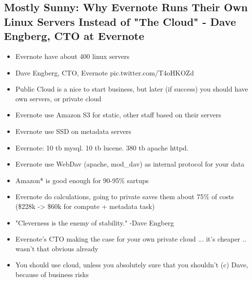 \documentclass[10pt]{article}
\begin{document}
{\subsection{Mostly Sunny: Why Evernote Runs Their Own Linux Servers Instead of "The Cloud" - Dave Engberg, CTO at Evernote}
\begin{itemize}
\item Evernote have about 400 linux servers
\item Dave Engberg, CTO, Evernote pic.twitter.com/T4oHKOZd
\item Public Cloud is a nice to start business, but later (if success) you should have own servers, or private cloud
\item Evernote use Amazon S3 for static, other staff based on their servers
\item Evernote use SSD on metadata servers
\item Evernote: 10 tb mysql. 10 tb lucene. 380 tb apache httpd. 
\item Evernote use WebDav (apache, mod\_dav) as internal protocol for your data
\item Amazon* is good enough for 90-95\% sartups
\item Evernote do calculations, going to private saves them about 75\% of costs (\$228k -> \$60k for compute + metadata task)
\item "Cleverness is the enemy of stability." -Dave Engberg
\item Evernote's CTO making the case for your own private cloud ... it's cheaper .. wasn't that obvious already 
\item You should use cloud, unless you absolutely sure that you shouldn't (c) Dave, because of business risks
\end{itemize}

}
\end{document}
